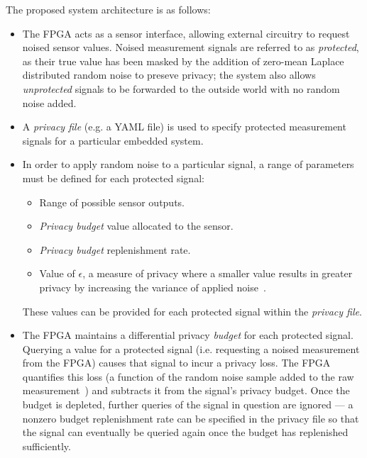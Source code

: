 \documentclass[12pt]{article}
\begin{document}
    The proposed system architecture is as follows:
    \begin{itemize}
      \item The FPGA acts as a sensor interface, allowing external circuitry to request noised sensor values. Noised measurement signals are referred to as \textit{protected}, as their true value has been masked by the addition of zero-mean Laplace distributed random noise to preseve privacy; the system also allows \textit{unprotected} signals to be forwarded to the outside world with no random noise added. %
      \item A \textit{privacy file} (e.g. a YAML file) is used to specify protected measurement signals for a particular embedded system.
      \item In order to apply random noise to a particular signal, a range of parameters must be defined for each protected signal:
      \begin{itemize}
        \item Range of possible sensor outputs.
        \item \textit{Privacy budget} value allocated to the sensor.
        \item \textit{Privacy budget} replenishment rate.
        \item Value of $\epsilon$, a measure of privacy where a smaller value results in greater privacy by increasing the variance of applied noise~\cite{Choi2018GuaranteeingLD}.
      \end{itemize}
      These values can be provided for each protected signal within the \textit{privacy file}.
      \item The FPGA maintains a differential privacy \textit{budget} for each protected signal. Querying a value for a protected signal (i.e. requesting a noised measurement from the FPGA) causes that signal to incur a privacy loss. The FPGA quantifies this loss (a function of the random noise sample added to the raw measurement~\cite{Choi2018GuaranteeingLD}) and subtracts it from the signal's privacy budget. Once the budget is depleted, further queries of the signal in question are ignored --- a nonzero budget replenishment rate can be specified in the privacy file so that the signal can eventually be queried again once the budget has replenished sufficiently.

\end{itemize}
\end{document}
